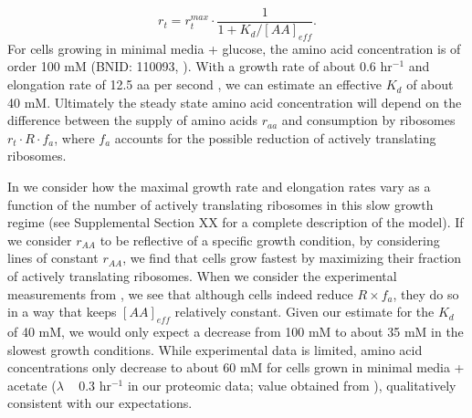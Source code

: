 \begin{equation}
r_t = r_t^{max} \cdot \frac{1}{1 + K_d / [AA]_{eff}}.
\label{eq:rate_Kd}
\end{equation}
For cells growing in minimal media + glucose, the amino acid concentration is of
order 100 mM  (BNID: 110093, \citep{milo2010, bennett2009}). With a growth rate
of about 0.6 hr$^{-1}$ and elongation rate of 12.5 aa per second
\citep{dai2016}, we can estimate an effective $K_d$ of about 40 mM. Ultimately
the steady state amino acid concentration will depend on the difference between
the supply of amino acids $r_{aa}$ and consumption by ribosomes $r_t \cdot R
\cdot f_a$, where $f_a$ accounts for the possible reduction of actively
translating ribosomes.

In  we consider how the maximal growth rate and
elongation rates vary as a function of the number of actively translating
ribosomes in this slow growth regime (see Supplemental Section XX for a complete
description of the model). If we consider $r_{AA}$ to be reflective of a specific
growth condition, by considering lines of constant $r_{AA}$, we find that cells
grow fastest by maximizing their fraction of actively translating ribosomes.
When we consider the experimental measurements from \cite{dai2018}, we see
that although cells indeed reduce $R \times f_a$, they do so in a way that keeps
$[AA]_{eff}$ relatively constant. Given our estimate for the $K_d$ of 40 mM,  we
would only expect a decrease from 100 mM to about 35 mM in the slowest growth
conditions. While experimental data is limited, amino acid concentrations only
decrease to about 60 mM for cells grown in minimal media + acetate ($\lambda$ ~
0.3 hr$^{-1}$ in our proteomic data; value obtained from \cite{bennett2009}),
qualitatively consistent with our expectations.

